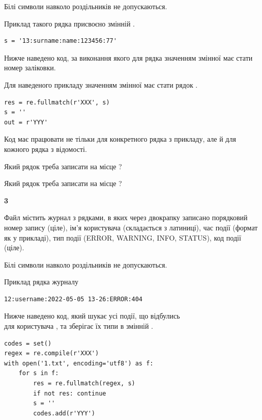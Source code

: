 Білі символи навколо роздільників не допускаються.

Приклад такого рядка присвоєно змінній .



\begin{verbatim}
s = '13:surname:name:123456:77'
\end{verbatim}


Нижче наведено код, за виконання якого для рядка  значенням змінної  має стати номер заліковки.

Для наведеного прикладу значенням змінної  має стати рядок  .



\begin{verbatim}
res = re.fullmatch(r'XXX', s)
s = ''
out = r'YYY'
\end{verbatim}


Код має працювати не тільки для конкретного рядка з прикладу, але й для кожного рядка з відомості.




Який рядок треба записати на місце  ?\par
\vspace{5mm}


Який рядок треба записати на місце  ?\par


\newpage

{\begin {center}\textbf{ 3}\end {center}}\par
Файл  містить журнал з рядками, в яких через двокрапку записано поряд\-ко\-вий номер запису (ціле), ім'я користувача (складається з латиниці), час події (фор\-мат як у прикладі), тип події (ERROR, WARNING, INFO, STATUS), код події (ціле).

Білі символи навколо роздільників не допускаються.

Приклад рядка журналу



\begin{verbatim}
12:username:2022-05-05 13-26:ERROR:404
\end{verbatim}


Нижче наведено код, який шукає усі події, що відбулись\\ для користувача , та зберігає їх типи в змінній .



\begin{verbatim}
codes = set()
regex = re.compile(r'XXX')
with open('1.txt', encoding='utf8') as f:
    for s in f:
        res = re.fullmatch(regex, s)
        if not res: continue
        s = ''
        codes.add(r'YYY')
\end{verbatim}





